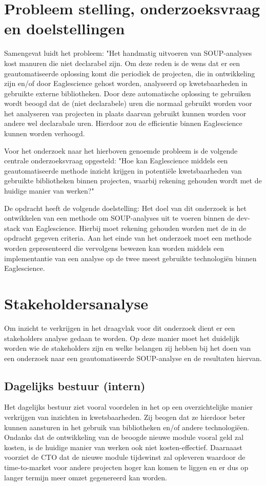 \section{Probleem stelling, onderzoeksvraag en doelstellingen}\label{sec:probleem-stelling-onderzoeksvraag-en-doelstellingen}
Samengevat luidt het probleem: "Het handmatig uitvoeren van SOUP-analyses kost manuren die niet declarabel zijn. Om deze reden is de wens dat er een geautomatiseerde oplossing komt die periodiek de projecten, die in ontwikkeling zijn en/of door Eaglescience gehost worden, analyseerd op kwetsbaarheden in gebruikte externe bibliotheken. Door deze automatische oplossing te gebruiken wordt beoogd dat de (niet declarabele) uren die normaal gebruikt worden voor het analyseren van projecten in plaats daarvan gebruikt kunnen worden voor andere wel declarabale uren. Hierdoor zou de efficientie binnen Eaglescience kunnen worden verhoogd.

Voor het onderzoek naar het hierboven genoemde probleem is de volgende centrale onderzoeksvraag opgesteld: "Hoe kan Eaglescience middels een geautomatiseerde methode inzicht krijgen in potentiële kwetsbaarheden van gebruikte bibliotheken binnen projecten, waarbij rekening gehouden wordt met de huidige manier van werken?"

De opdracht heeft de volgende doelstelling:
Het doel van dit onderzoek is het ontwikkelen van een methode om SOUP-analyses uit te voeren binnen de dev-stack van Eaglescience. Hierbij moet rekening gehouden worden met de in de opdracht gegeven criteria. Aan het einde van het onderzoek moet een methode worden gepresenteerd die vervolgens bewezen kan worden middels een implementantie van een analyse op de twee meest gebruikte technologiën binnen Eaglescience.


\section{Stakeholdersanalyse}\label{sec:stakeholdersanalyse}
Om inzicht te verkrijgen in het draagvlak voor dit onderzoek dient er een stakeholders analyse gedaan te worden. Op deze manier moet het duidelijk worden wie de stakeholders zijn en welke belangen zij hebben bij het doen van een onderzoek naar een geautomatiseerde SOUP-analyse en de resultaten hiervan.

\subsection{Dagelijks bestuur (intern)}\label{subsec:dagelijks-bestuur-(intern)1}
Het dagelijks bestuur ziet vooral voordelen in het op een overzichtelijke manier verkrijgen van inzichten in kwetsbaarheden. Zij beogen dat ze hierdoor beter kunnen aansturen in het gebruik van bibliotheken en/of andere technologiëen. Ondanks dat de ontwikkeling van de beoogde nieuwe module vooral geld zal kosten, is de huidige manier van werken ook niet kosten-effectief. Daarnaast voorziet de CTO dat de nieuwe module tijdswinst zal opleveren waardoor de time-to-market voor andere projecten hoger kan komen te liggen en er dus op langer termijn meer omzet gegenereerd kan worden.

